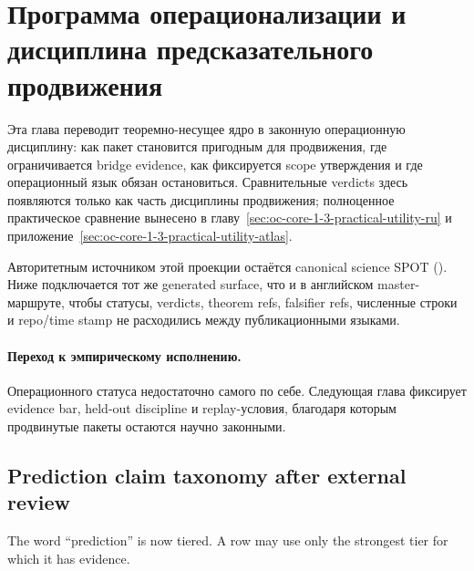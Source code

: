 \section{Программа операционализации и дисциплина предсказательного продвижения}
\label{sec:oc-core-1-3-operationalization-program-ru}

Эта глава переводит теоремно-несущее ядро в законную операционную дисциплину:
как пакет становится пригодным для продвижения, где ограничивается bridge
evidence, как фиксируется scope утверждения и где операционный язык обязан
остановиться. Сравнительные verdicts здесь появляются только как часть
дисциплины продвижения; полноценное практическое сравнение вынесено в
главу~\ref{sec:oc-core-1-3-practical-utility-ru} и
приложение~\ref{sec:oc-core-1-3-practical-utility-atlas}.

Авторитетным источником этой проекции остаётся canonical science SPOT
(). Ниже подключается тот же generated
surface, что и в английском master-маршруте, чтобы статусы, verdicts, theorem
refs, falsifier refs, численные строки и repo/time stamp не расходились между
публикационными языками.

\begingroup
\small

\endgroup

\paragraph{Переход к эмпирическому исполнению.}
Операционного статуса недостаточно самого по себе. Следующая глава фиксирует
evidence bar, held-out discipline и replay-условия, благодаря которым
продвинутые пакеты остаются научно законными.


\subsection{Prediction claim taxonomy after external review}
\label{sec:oc13-prediction-claim-taxonomy-v3}

The word ``prediction'' is now tiered. A row may use only the strongest tier for
which it has evidence.

